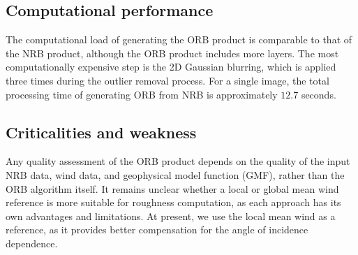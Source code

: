 \subsection{Computational performance}
\label{sec:orb_computation}
The computational load of generating the ORB product is comparable to that of the NRB product, although the ORB product includes more layers. The most computationally expensive step is the 2D Gaussian blurring, which is applied three times during the outlier removal process. For a single image, the total processing time of generating ORB from NRB is approximately $12.7$ seconds.
\subsection{Criticalities and weakness}
\label{sec:orb_criticalities}
Any quality assessment of the ORB product depends on the quality of the input NRB data, wind data, and geophysical model function (GMF), rather than the ORB algorithm itself. It remains unclear whether a local or global mean wind reference is more suitable for roughness computation, as each approach has its own advantages and limitations. At present, we use the local mean wind as a reference, as it provides better compensation for the angle of incidence dependence. 